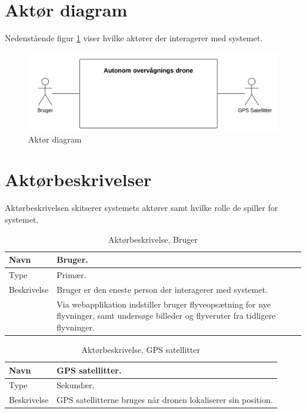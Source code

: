 \section{Aktør diagram}
Nedenstående figur \ref{fig:ATD} viser hvilke aktører der interagerer med systemet.

\begin{figure}[H]
\centering
\includegraphics[width=1\textwidth]{Billeder/Aktor_diagram.png}
\caption{Aktør diagram}
\label{fig:ATD}
\end{figure}

\section{Aktørbeskrivelser}
Aktørbeskrivelsen skitserer systemets aktører samt hvilke rolle de spiller for systemet.


\begin{table}[H]
\begin{tabular}{|l|p{12.25cm}|} \hline

Navn					& Bruger. 	\\\hline
Type					& Primær.	\\\hline
Beskrivelse				& Bruger er den eneste person der interagerer med systemet.\\
						& Via webapplikation indstiller bruger flyveopsætning for nye flyvninger, samt undersøge billeder og flyveruter fra tidligere flyvninger.\\\hline
						
\end{tabular}
\caption{Aktørbeskrivelse, Bruger}
\label{tab:AB1}
\end{table}


\begin{table}[H]
\begin{tabular}{|l|p{12.25cm}|}
\hline
Navn					& GPS satellitter. 	\\\hline
Type					& Sekundær.	\\\hline
Beskrivelse				& GPS satellitterne bruges når dronen lokaliserer sin position.\\\hline

\end{tabular}
\caption{Aktørbeskrivelse, GPS satellitter}
\label{tab:AB1}
\end{table}